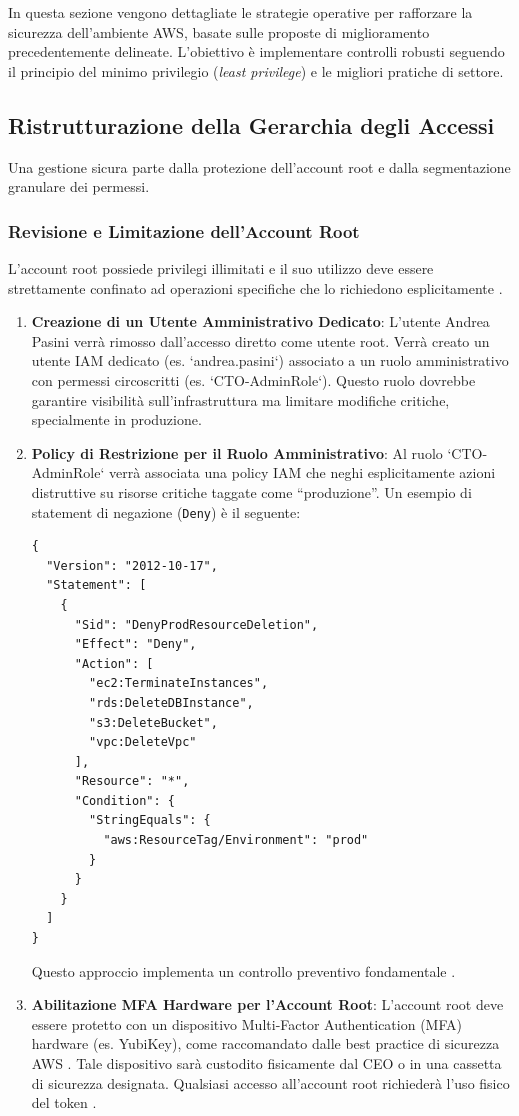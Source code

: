 \documentclass[a4paper,12pt]{report}
\begin{document}
In questa sezione vengono dettagliate le strategie operative per rafforzare la sicurezza dell'ambiente AWS, basate sulle proposte di miglioramento precedentemente delineate. L'obiettivo è implementare controlli robusti seguendo il principio del minimo privilegio (\emph{least privilege}) e le migliori pratiche di settore.

\subsection{Ristrutturazione della Gerarchia degli Accessi}

Una gestione sicura parte dalla protezione dell'account root e dalla segmentazione granulare dei permessi.

\subsubsection{Revisione e Limitazione dell'Account Root}

L'account root possiede privilegi illimitati e il suo utilizzo deve essere strettamente confinato ad operazioni specifiche che lo richiedono esplicitamente \cite{aws:iam:bestpractices}.
\begin{enumerate}
    \item \textbf{Creazione di un Utente Amministrativo Dedicato}: L'utente Andrea Pasini verrà rimosso dall'accesso diretto come utente root. Verrà creato un utente IAM dedicato (es. `andrea.pasini`) associato a un ruolo amministrativo con permessi circoscritti (es. `CTO-AdminRole`). Questo ruolo dovrebbe garantire visibilità sull'infrastruttura ma limitare modifiche critiche, specialmente in produzione.
    \item \textbf{Policy di Restrizione per il Ruolo Amministrativo}: Al ruolo `CTO-AdminRole` verrà associata una policy IAM che neghi esplicitamente azioni distruttive su risorse critiche taggate come \enquote{produzione}. Un esempio di statement di negazione (\texttt{Deny}) è il seguente:
    \begin{lstlisting}[style=json, caption={Policy IAM per negare eliminazioni in produzione}, label=lst:deny-prod-delete]
{
  "Version": "2012-10-17",
  "Statement": [
    {
      "Sid": "DenyProdResourceDeletion",
      "Effect": "Deny",
      "Action": [
        "ec2:TerminateInstances",
        "rds:DeleteDBInstance",
        "s3:DeleteBucket",
        "vpc:DeleteVpc"
      ],
      "Resource": "*",
      "Condition": {
        "StringEquals": {
          "aws:ResourceTag/Environment": "prod"
        }
      }
    }
  ]
}
    \end{lstlisting}
    Questo approccio implementa un controllo preventivo fondamentale \cite{aws:iam:boundaries}.
    \item \textbf{Abilitazione MFA Hardware per l'Account Root}: L'account root deve essere protetto con un dispositivo Multi-Factor Authentication (MFA) hardware (es. YubiKey), come raccomandato dalle best practice di sicurezza AWS \cite{clouddefense:mfa}. Tale dispositivo sarà custodito fisicamente dal CEO o in una cassetta di sicurezza designata. Qualsiasi accesso all'account root richiederà l'uso fisico del token \cite{saraswat:breakglass}.
\end{enumerate}
\end{document}
